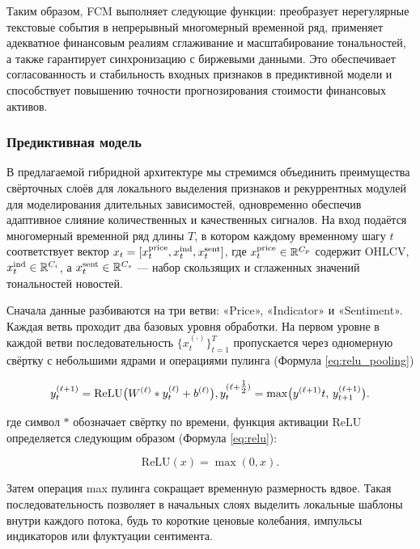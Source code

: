 Таким образом, FCM выполняет следующие функции: преобразует нерегулярные текстовые
события в непрерывный многомерный временной ряд, применяет адекватное финансовым реалиям сглаживание и масштабирование
тональностей, а также гарантирует синхронизацию с биржевыми данными. Это обеспечивает согласованность и стабильность
входных признаков в предиктивной модели и способствует повышению точности прогнозирования стоимости финансовых активов.

\subsubsection{Предиктивная модель}
В предлагаемой гибридной архитектуре мы стремимся объединить преимущества свёрточных слоёв для локального
выделения признаков и рекуррентных модулей для моделирования длительных зависимостей, одновременно
обеспечив адаптивное слияние количественных и качественных сигналов. На вход подаётся многомерный
временной ряд длины $T$, в котором каждому временному шагу $t$ соответствует вектор
$x_t = [x_t^{\rm price}, x_t^{\rm ind}, x_t^{\rm sent}]$, где $x_t^{\rm price}\in\mathbb{R}^{C_p}$
содержит OHLCV, $x_t^{\rm ind}\in\mathbb{R}^{C_i}$, а $x_t^{\rm sent}\in\mathbb{R}^{C_s}$ ---
набор скользящих и сглаженных значений тональностей новостей.

Сначала данные разбиваются на три ветви: «Price», «Indicator» и «Sentiment». Каждая ветвь проходит два
базовых уровня обработки. На первом уровне в каждой ветви последовательность $\{x_t^{(\cdot)}\}_{t=1}^T$
пропускается через одномерную свёртку с небольшими ядрами и операциями пулинга (Формула \ref{eq:relu_pooling})

\begin{equation}\label{eq:relu_pooling}
    y^{(\ell+1)}_{t} = \mathrm{ReLU}\bigl(W^{(\ell)} * y^{(\ell)}_{t} + b^{(\ell)}\bigr), \\
    y^{(\ell+\tfrac12)}_{t} = \max\bigl(y^{(\ell+1)}{t},\,y^{(\ell+1)}_{t+1}\bigr).
\end{equation}

где символ $*$ обозначает свёртку по времени, функция активации $\mathrm{ReLU}$ определяется следующим образом (Формула \ref{eq:relu}):

\begin{equation}\label{eq:relu}
    \mathrm{ReLU}(x)=\max(0, x).
\end{equation}

Затем операция max пулинга сокращает временную размерность вдвое. Такая последовательность позволяет
в начальных слоях выделить локальные шаблоны внутри каждого потока, будь то короткие ценовые колебания,
импульсы индикаторов или флуктуации сентимента.

